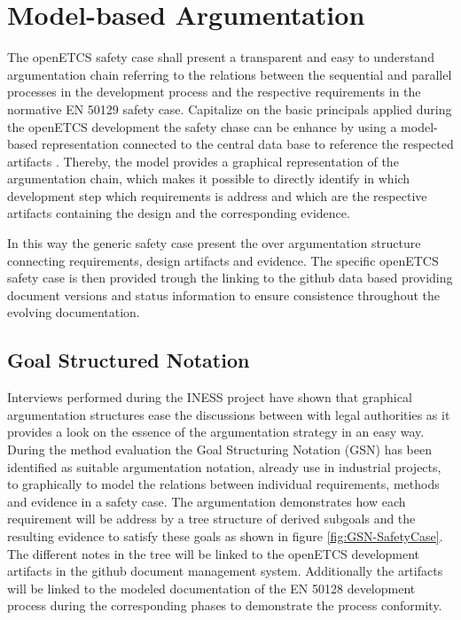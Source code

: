 \documentclass{template/openetcs_report}
\begin{document}
\section{Model-based Argumentation}

The openETCS safety case shall present a transparent and easy to understand argumentation chain referring to the relations between the sequential and parallel processes in the development process and the respective requirements in the normative EN 50129 safety case. Capitalize on the basic principals applied during the openETCS development the safety chase can be enhance by using a model-based representation connected to the central data base to reference the respected artifacts \cite{Muller.2010}. Thereby, the model provides a graphical representation of the argumentation chain, which makes it possible to directly identify in which development step which requirements is address and which are the respective artifacts containing the design and the corresponding evidence. 

In this way the generic safety case present the over argumentation structure connecting requirements, design artifacts and evidence. The specific openETCS safety case is then provided trough the linking to the github data based providing document versions and status information to ensure consistence throughout the evolving documentation.

\subsection{Goal Structured Notation}

Interviews performed during the INESS project have shown that graphical argumentation structures ease the discussions between with legal authorities as it provides a look on the essence of the argumentation strategy in an easy way. During the method evaluation the Goal Structuring Notation (GSN) \cite{Kelly.2004thegoal, GSNwebsite} has been identified as suitable argumentation notation, already use in industrial projects, to  graphically  to model the relations between individual requirements, methods and evidence in a safety case. The argumentation demonstrates how each requirement will be address by a tree structure of derived subgoals and the resulting evidence to satisfy these goals as shown in figure \ref{fig:GSN-SafetyCase}. The different notes in the tree will be linked to the openETCS development artifacts in the github document management system. Additionally the artifacts will be linked to the modeled documentation of the EN 50128 development process during the corresponding phases to demonstrate the process conformity. 
 
\end{document}
